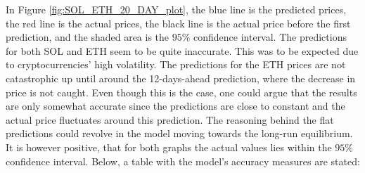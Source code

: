 \noindent In Figure \ref{fig:SOL_ETH_20_DAY_plot}, the blue line is the predicted prices, the red line is the actual prices, the black line is the actual price before the first prediction, and the shaded area is the $95\%$ confidence interval. The predictions for both SOL and ETH seem to be quite inaccurate. This was to be expected due to cryptocurrencies' high volatility. The predictions for the ETH prices are not catastrophic up until around the 12-days-ahead prediction, where the decrease in price is not caught. Even though this is the case, one could argue that the results are only somewhat accurate since the predictions are close to constant and the actual price fluctuates around this prediction. The reasoning behind the flat predictions could revolve in the model moving towards the long-run equilibrium. It is however positive, that for both graphs the actual values lies within the $95\%$ confidence interval. Below, a table with the model's accuracy measures are stated:

